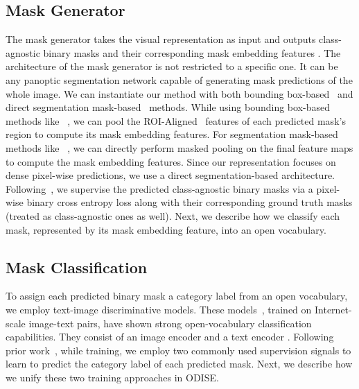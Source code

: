 \documentclass[10pt,twocolumn,letterpaper]{article}
\newcommand{\ourmethod}{ODISE}
\begin{document}
\subsection{Mask Generator}
\label{sec:mask-generator}
The mask generator takes the visual representation  as input and outputs  class-agnostic binary masks  and their corresponding  mask embedding features .
The architecture of the mask generator is not restricted to a specific one. 
It can be any panoptic segmentation network capable of generating mask predictions of the whole image. 
We can instantiate our method with both bounding box-based~\cite{carion2020detr, kirillov2019panopticfpn} and direct segmentation mask-based~\cite{cheng2020panopticdeeplab, cheng2021maskformer, cheng2022mask2former, wang2021maxdeeplab} methods.
While using bounding box-based methods like ~\cite{carion2020detr, kirillov2019panopticfpn}, we can pool the ROI-Aligned~\cite{he2017maskrcnn} features of each predicted mask's region to compute its mask embedding features.
For segmentation mask-based methods like ~\cite{cheng2020panopticdeeplab, cheng2021maskformer, cheng2022mask2former, wang2021maxdeeplab}, we can directly perform masked pooling on the final feature maps to compute the mask embedding features. 
Since our representation focuses on dense pixel-wise predictions, we use a direct segmentation-based architecture. 
Following~\cite{he2017maskrcnn}, we supervise the predicted class-agnostic binary masks via a pixel-wise binary cross entropy loss along with their corresponding ground truth masks (treated as class-agnostic ones as well).
Next, we describe how we classify each mask, represented by its mask embedding feature, into an open vocabulary.  

\subsection{Mask Classification}
\label{sec:discriminative}

To assign each predicted binary mask a category label from an open vocabulary, we employ text-image discriminative models.
These models~\cite{radford2021clip, jia2021align, mu2021slip}, trained on Internet-scale image-text pairs, have shown strong open-vocabulary classification capabilities. 
They consist of an image encoder  and a text encoder . 
Following prior work~\cite{ghiasi2021open, li2022language}, while training, we employ two commonly used supervision signals to learn to predict the category label of each predicted mask. 
Next, we describe how we unify these two training approaches in \ourmethod{}. 
\end{document}
